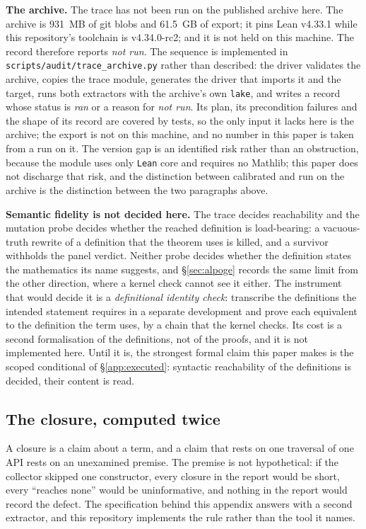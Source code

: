 \documentclass[11pt,a4paper]{article}
\begin{document}
\textbf{The archive.} The trace has not been run on the published archive here. The
archive is 931~MB of git blobs and 61.5~GB of export; it pins Lean v4.33.1 while this repository's
toolchain is v4.34.0-rc2; and it is not held on this machine. The record therefore reports
\emph{not run}. The sequence is implemented in \texttt{scripts/audit/trace\_archive.py} rather than
described: the driver validates the archive, copies the trace module, generates the driver that
imports it and the target, runs both extractors with the archive's own \texttt{lake}, and writes a
record whose status is \emph{ran} or a reason for \emph{not run}. Its plan, its precondition
failures and the shape of its record are covered by tests, so the only input it lacks here is the
archive; the export is not on this machine, and no number in this paper is taken from a run on
it. The version gap is an identified risk rather than an
obstruction, because the module uses only \texttt{Lean} core and requires no Mathlib; this paper
does not discharge that risk, and the distinction between calibrated and run on the archive is the
distinction between the two paragraphs above.

\textbf{Semantic fidelity is not decided here.} The trace decides reachability and the mutation
probe decides whether the reached definition is load-bearing: a vacuous-truth rewrite of a
definition that the theorem uses is killed, and a survivor withholds the panel verdict. Neither
probe decides whether the definition states the mathematics its name suggests, and
\S\ref{sec:alpoge} records the same limit from the other direction, where a kernel check cannot see
it either. The instrument that would decide it is a \emph{definitional identity check}: transcribe
the definitions the intended statement requires in a separate development and prove each equivalent
to the definition the term uses, by a chain that the kernel checks. Its cost is a second
formalisation of the definitions, not of the proofs, and it is not implemented here. Until it is,
the strongest formal claim this paper makes is the scoped conditional of \S\ref{app:executed}:
syntactic reachability of the definitions is decided, their content is read.

\subsection{The closure, computed twice}
\label{sec:crossval}

A closure is a claim about a term, and a claim that rests on one traversal of one API
rests on an unexamined premise. The premise is not hypothetical: if the collector skipped one
constructor, every closure in the report would be short, every ``reaches none'' would be
uninformative, and nothing in the report would record the defect. The specification behind this
appendix answers with a second extractor, and this repository implements the rule rather than the
tool it names.
\end{document}
